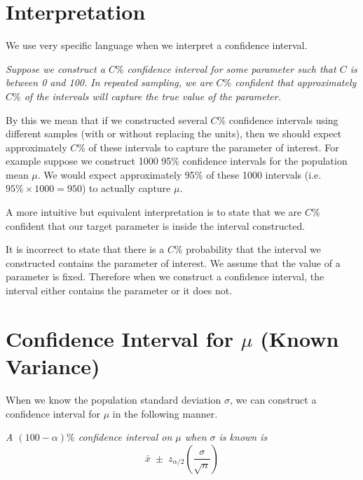 \section{Interpretation}

We use very specific language when we interpret a confidence interval.

\begin{tcolorbox}[
    colback=yellow!10, 
    colframe=black!80, 
    sharp corners=south, 
    boxrule=0.5pt,
    breakable,
    enhanced
]
\textit{Suppose we construct a $C\%$ confidence interval for some parameter such that $C$ is between 0 and 100. In repeated sampling, we are $C\%$ confident that approximately $C\%$ of the intervals will capture the true value of the parameter.}
\end{tcolorbox}

\bigskip

By this we mean that if we constructed several $C\%$ confidence intervals using different samples (with or without replacing the units), then we should expect approximately $C\%$ of these intervals to capture the parameter of interest. For example suppose we construct 1000 95\% confidence intervals for the population mean $\mu$. We would expect approximately 95\% of these 1000 intervals (i.e.\ $95\% \times 1000 = 950$) to actually capture $\mu$.



\begin{nt}
A more intuitive but equivalent interpretation is to state that we are $C$\% confident that our target parameter is inside the interval constructed.
\end{nt}

It is incorrect to state that there is a $C\%$ probability that 
the interval we constructed contains the parameter of interest.
We assume that the value of a parameter is fixed. Therefore when we construct a confidence interval, the interval either contains the parameter or it does not.
\section{Confidence Interval for $\mu$ (Known Variance)}
When we know the population standard deviation $\sigma$, we can construct a confidence interval for $\mu$ in the following manner.

\begin{tcolorbox}[
    colback=yellow!10, 
    colframe=black!20, 
    sharp corners=south, 
    boxrule=0.5pt,
    breakable,
    enhanced,
    title={\textbf{Confidence Interval 6.1} (Confidence Interval on $\mu$ when $\sigma$ is Known)}
]

\textit{A $(100 - \alpha)\%$ confidence interval on $\mu$ when $\sigma$ is known is}
\[
\bar{x} \; \pm \; z_{\alpha/2} \left( \frac{\sigma}{\sqrt{n}} \right)
\]

\end{tcolorbox}

